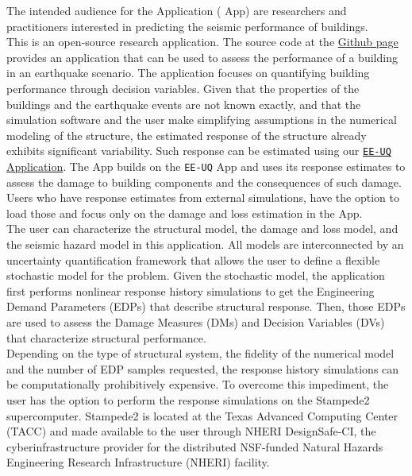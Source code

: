The intended audience for the \texttt{\getsoftwarename{}} Application (\texttt{\getsoftwarename{}} App) are researchers and practitioners interested in predicting the seismic performance of buildings.\\

This is an open-source research application. The source code at the \href{https://github.com/NHERI-SimCenter/PBE}{\texttt{\getsoftwarename{}} Github page} provides an application that can be used to assess the performance of a building in an earthquake scenario. The application focuses on quantifying building performance through decision variables. Given that the properties of the buildings and the earthquake events are not known exactly, and that the simulation software and the user make simplifying assumptions in the numerical modeling of the structure, the estimated response of the structure already exhibits significant variability. Such response can be estimated using our \href{https://simcenter.designsafe-ci.org/research-tools/ee-uq-application/}{\texttt{EE-UQ} Application}. The \texttt{\getsoftwarename{}} App builds on the \texttt{EE-UQ} App and uses its response estimates to assess the damage to building components and the consequences of such damage. Users who have response estimates from external simulations, have the option to load those and focus only on the damage and loss estimation in the \texttt{\getsoftwarename{}} App.\\

The user can characterize the structural model, the damage and loss model, and the seismic hazard model in this application. All models are interconnected by an uncertainty quantification framework that allows the user to define a flexible stochastic model for the problem. Given the stochastic model, the application first performs nonlinear response history simulations to get the Engineering Demand Parameters (EDPs) that describe structural response. Then, those EDPs are used to assess the Damage Measures (DMs) and Decision Variables (DVs) that characterize structural performance.\\

Depending on the type of structural system, the fidelity of the numerical model and the number of EDP samples requested, the response history simulations can be computationally prohibitively expensive. To overcome this impediment, the user has the option to perform the response simulations on the Stampede2 supercomputer. Stampede2 is located at the Texas Advanced Computing Center (TACC) and made available to the user through NHERI DesignSafe-CI, the cyberinfrastructure provider for the distributed NSF-funded Natural Hazards Engineering Research Infrastructure (NHERI) facility.\\

